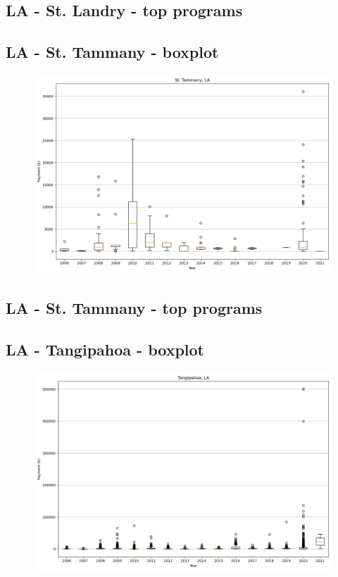 \subsection*{LA - St. Landry - top programs}

\newpage
\subsection*{LA - St. Tammany - boxplot}
\begin{figure}[h]
\centering
\includegraphics[width=7in]{../output/boxplots/counties/St. Tammany-LA_boxplot.png}
\end{figure}


\subsection*{LA - St. Tammany - top programs}

\newpage
\subsection*{LA - Tangipahoa - boxplot}
\begin{figure}[h]
\centering
\includegraphics[width=7in]{../output/boxplots/counties/Tangipahoa-LA_boxplot.png}
\end{figure}


